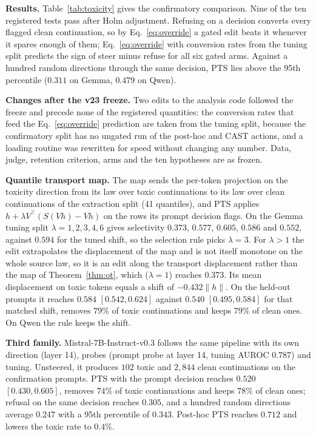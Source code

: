 \documentclass{article}
\begin{document}
\textbf{Results.} Table~\ref{tab:toxicity} gives the confirmatory comparison.
Nine of the ten registered tests pass after Holm adjustment. Refusing on a decision
converts every flagged clean continuation, so by Eq.~\eqref{eq:override} a
gated edit beats it whenever it spares enough of them; Eq.~\eqref{eq:override}
with conversion rates from the tuning split predicts the sign of steer minus
refuse for all six gated arms. Against a hundred random directions through the
same decision, PTS lies above the 95th percentile ($0.311$ on Gemma, $0.479$ on
Qwen).

\textbf{Changes after the v23 freeze.} Two edits to the analysis code followed
the freeze and precede none of the registered quantities: the conversion rates
that feed the Eq.~\eqref{eq:override} prediction are taken from the tuning
split, because the confirmatory split has no ungated run of the post-hoc and
CAST actions, and a loading routine was rewritten for speed without changing
any number. Data, judge, retention criterion, arms and the ten hypotheses are
as frozen.

\textbf{Quantile transport map.} The map sends the per-token projection on the
toxicity direction from its law over toxic continuations to its law over clean
continuations of the extraction split (41 quantiles), and PTS applies
$h+\lambda V^\top(S(Vh)-Vh)$ on the rows its prompt decision flags. On the
Gemma tuning split $\lambda=1,2,3,4,6$ gives selectivity $0.373$, $0.577$,
$0.605$, $0.586$ and $0.552$, against $0.594$ for the tuned shift, so the
selection rule picks $\lambda=3$. For $\lambda>1$ the edit extrapolates the
displacement of the map and is not itself monotone on the whole source law, so
it is an edit along the transport displacement rather than the map of
Theorem~\ref{thm:ot}, which ($\lambda=1$) reaches $0.373$. Its mean displacement on toxic
tokens equals a shift of $-0.432\lVert h\rVert$. On the held-out prompts it
reaches $0.584$ $[0.542, 0.624]$ against $0.540$ $[0.495, 0.584]$ for that
matched shift, removes $79\%$ of toxic continuations and keeps $79\%$ of clean
ones. On Qwen the rule keeps the shift.

\textbf{Third family.} Mistral-7B-Instruct-v0.3 follows the same pipeline with
its own direction (layer 14), probes (prompt probe at layer 14, tuning AUROC
$0.787$) and tuning. Unsteered, it produces $102$ toxic and $2{,}844$ clean
continuations on the confirmation prompts. PTS with the prompt decision reaches
$0.520$ $[0.430, 0.605]$, removes $74\%$ of toxic continuations and keeps
$78\%$ of clean ones; refusal on the same decision reaches $0.305$, and a
hundred random directions average $0.247$ with a 95th percentile of $0.343$.
Post-hoc PTS reaches $0.712$ and lowers the toxic rate to $0.4\%$.
\end{document}

